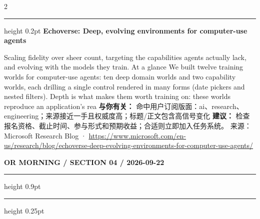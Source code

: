 \documentclass[10.5pt]{ctexart}
\begin{document}
\begin{multicols}{2}
\vspace{2mm}
\hrule height 0.2pt
\vspace{2mm}
{\large\bfseries Echoverse: Deep, evolving environments for computer-use agents}\par
Scaling fidelity over sheer count, targeting the capabilities agents actually lack, and evolving with the models they train. At a glance We built twelve training worlds for computer-use agents: ten deep domain worlds and two capability worlds, each drilling a single control rendered in many forms (date pickers and nested filters). Depth is what makes them worth training on: these worlds reproduce an application’s rea
\textbf{与你有关：} 命中用户订阅版面：ai、research、engineering；来源接近一手且权威度高；标题/正文包含高信号变化
\textbf{建议：} 检查报名资格、截止时间、参与形式和预期收益；合适则立即加入任务系统。
{\footnotesize\color{ormuted} 来源：Microsoft Research Blog · \url{https://www.microsoft.com/en-us/research/blog/echoverse-deep-evolving-environments-for-computer-use-agents/}}
\end{multicols}
\newpage
{\small\bfseries OR MORNING / SECTION 04 / 2026-09-22}
\vspace{2mm}
\hrule height 0.9pt
\vspace{1.5mm}
\hrule height 0.25pt
\vspace{4mm}
\end{document}

